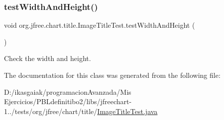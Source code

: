 \subsubsection{\texorpdfstring{test\+Width\+And\+Height()}{testWidthAndHeight()}}
{\footnotesize\ttfamily void org.\+jfree.\+chart.\+title.\+Image\+Title\+Test.\+test\+Width\+And\+Height (\begin{DoxyParamCaption}{ }\end{DoxyParamCaption})}

Check the width and height. 

The documentation for this class was generated from the following file\+:\begin{DoxyCompactItemize}
\item 
D\+:/ikasgaiak/programacion\+Avanzada/\+Mis Ejercicios/\+P\+B\+Ldefinitibo2/libs/jfreechart-\/1../tests/org/jfree/chart/title/\mbox{\hyperlink{_image_title_test_8java}{Image\+Title\+Test.\+java}}\end{DoxyCompactItemize}
